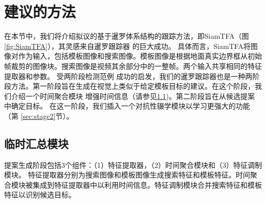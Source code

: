 \section{建议的方法}
\label{sec:method}
在本节中，我们将介绍拟议的基于暹罗体系结构的跟踪方法，即SiamTFA（图\ref{fig:SiamTFA}），其灵感来自暹罗跟踪器 \cite{SiamRPN++, Wang2018SiamMask}的巨大成功。
具体而言，SiamTFA将图像对作为输入，包括模板图像和搜索图像。模板图像是根据地面真实边界框从初始帧裁剪的图像块。搜索图像是视频其余部分中的一整帧。两个输入共享相同的特征提取器和参数。
受两阶段检测范例 \cite{ren2015faster}成功的启发，我们的暹罗跟踪器也是一种两阶段方法。第一阶段旨在生成在视觉上类似于给定模板目标的建议。在这个阶段，我们介绍一个时间聚合模块
增强时间信息（请参见\ref{sec:stage1})。第二阶段旨在从候选提案中确定目标。
在这一阶段，我们插入一个对抗性辍学模块以学习更强大的功能（第 \ref{sec:stage2}节）。

\subsection{临时汇总模块}
\label{sec:stage1}
提案生成阶段包括3个组件：（1）特征提取器，（2）时间聚合模块和（3）特征调制模块。
特征提取器分别为搜索图像和模板图像生成搜索特征和模板特征。时间聚合模块被集成到特征提取器中以利用时间信息。特征调制模块合并搜索特征和模板特征以识别候选目标。

